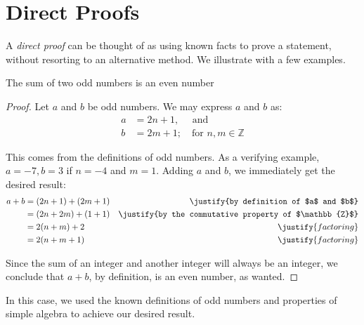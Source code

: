 \documentclass[../proofs.tex]{subfiles}
\begin{document}
\chapter{Direct Proofs}
  A \emph{direct proof} can be
  thought of as using known facts to prove a statement, without resorting to an
  alternative method. We illustrate with a few examples. \\

\begin{expl}{The sum of two odd numbers is an even number}
\begin{proof}
Let $a$ and $b$ be odd numbers. We may express $a$ and $b$ as:
\begin{align*}
  a &= 2n + 1, \quad \text{ and}   \\
  b &= 2m + 1; \quad \text{for } n,m \in \mathbb{Z}
\end{align*}

This comes from the definitions of odd numbers. As a verifying example,
$a = -7, b = 3$ if $n = -4$ and $m = 1$. Adding $a$ and $b$, we immediately get
the desired result:
\begin{align*}
  a + b &= (2n + 1) + (2m + 1) 	& \justify{by definition of $a$ and $b$} \\
       &= (2n + 2m) + (1 + 1) 	& \justify{by the commutative property of $\mathbb{Z}$} \\
       &= 2(n+m) + 2			& \justify{factoring} \\
       &= 2(n+m+1)				& \justify{factoring}
\end{align*}

Since the sum of an integer and another integer will always be an integer, we conclude that $a+b$, by definition, is an even number, as wanted.

\end{proof}

\end{expl}

In this case, we used the known definitions of odd numbers and properties of
simple algebra to achieve our desired result.
\end{document}
